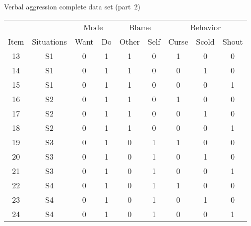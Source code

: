\documentclass[aspectratio=169]{beamer}
\begin{document}
\begin{frame}[fragile]{Verbal aggression complete data set (part~2)}
\scriptsize
\begin{tabular}{ccccccccc}\hline
&&\multicolumn{2}{c}{Mode} & 
  \multicolumn{2}{c}{Blame} & 
  \multicolumn{3}{c}{Behavior}\\\cline{3-9}
Item & Situations &
Want & Do & Other &
Self & Curse & Scold & Shout\\\hline
13 & S1 & 0 & 1 & 1 & 0 & 1 & 0 & 0 \\
14 & S1 & 0 & 1 & 1 & 0 & 0 & 1 & 0 \\
15 & S1 & 0 & 1 & 1 & 0 & 0 & 0 & 1 \\
16 & S2 & 0 & 1 & 1 & 0 & 1 & 0 & 0 \\
17 & S2 & 0 & 1 & 1 & 0 & 0 & 1 & 0 \\
18 & S2 & 0 & 1 & 1 & 0 & 0 & 0 & 1 \\
19 & S3 & 0 & 1 & 0 & 1 & 1 & 0 & 0 \\
20 & S3 & 0 & 1 & 0 & 1 & 0 & 1 & 0 \\
21 & S3 & 0 & 1 & 0 & 1 & 0 & 0 & 1 \\
22 & S4 & 0 & 1 & 0 & 1 & 1 & 0 & 0 \\
23 & S4 & 0 & 1 & 0 & 1 & 0 & 1 & 0 \\
24 & S4 & 0 & 1 & 0 & 1 & 0 & 0 & 1 \\\hline
\end{tabular}

\end{frame}
\end{document}
